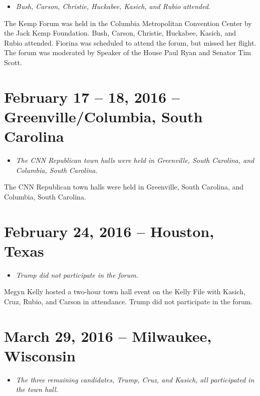\begin{itemize}
\item
  \emph{Bush, Carson, Christie, Huckabee, Kasich, and Rubio attended.}
\end{itemize}

The Kemp Forum was held in the Columbia Metropolitan Convention Center
by the Jack Kemp Foundation. Bush, Carson, Christie, Huckabee, Kasich,
and Rubio attended. Fiorina was scheduled to attend the forum, but
missed her flight. The forum was moderated by Speaker of the House Paul
Ryan and Senator Tim Scott.

\section{February 17 -- 18, 2016 -- Greenville/Columbia, South
Carolina}\label{february-17-18-2016-greenvillecolumbia-south-carolina}

\begin{itemize}
\item
  \emph{The CNN Republican town halls were held in Greenville, South
  Carolina, and Columbia, South Carolina.}
\end{itemize}

The CNN Republican town halls were held in Greenville, South Carolina,
and Columbia, South Carolina.

\section{February 24, 2016 -- Houston,
Texas}\label{february-24-2016-houston-texas}

\begin{itemize}
\item
  \emph{Trump did not participate in the forum.}
\end{itemize}

Megyn Kelly hosted a two-hour town hall event on the Kelly File with
Kasich, Cruz, Rubio, and Carson in attendance. Trump did not participate
in the forum.

\section{March 29, 2016 -- Milwaukee,
Wisconsin}\label{march-29-2016-milwaukee-wisconsin}

\begin{itemize}
\item
  \emph{The three remaining candidates, Trump, Cruz, and Kasich, all
  participated in the town hall.}
\end{itemize}

